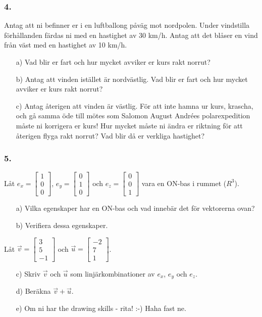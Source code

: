 \documentclass{article}
\begin{document}
\subsubsection*{4.}
Antag att ni befinner er i en luftballong påväg mot nordpolen. Under vindstilla förhållanden färdas ni med en hastighet av 30 km/h. Antag att det blåser en vind från väst med en hastighet av 10 km/h.
\begin{itemize}
\item[a) ] Vad blir er fart och hur mycket avviker er kurs rakt norrut?
\item[b) ] Antag att vinden istället är nordvästlig. Vad blir er fart och hur mycket avviker er kurs rakt norrut?
\item[c) ] Antag återigen att vinden är västlig. För att inte hamna ur kurs, krascha, och gå samma öde till mötes som Salomon August Andrées polarexpedition måste ni korrigera er kurs! Hur mycket måste ni ändra er riktning för att återigen flyga rakt norrut? Vad blir då er verkliga hastighet?
\end{itemize}

\subsubsection*{5.}
Låt $e_x = \begin{bmatrix} 1 \\ 0 \\ 0 \end{bmatrix}$, $e_y = \begin{bmatrix} 0 \\ 1 \\ 0 \end{bmatrix}$ och $e_z = \begin{bmatrix} 0 \\ 0 \\ 1 \end{bmatrix}$ vara en ON-bas i rummet ($R^3$).
\begin{itemize}
\item[a) ] Vilka egenskaper har en ON-bas och vad innebär det för vektorerna ovan?
\item[b) ] Verifiera dessa egenskaper.
\end{itemize}

Låt $\vec{v} = \begin{bmatrix} 3 \\ 5 \\ -1 \end{bmatrix}$ och $\vec{u} = \begin{bmatrix} -2 \\ 7 \\ 1 \end{bmatrix}$. 
\begin{itemize} 
\item[c) ] Skriv $\vec{v}$ och $\vec{u}$ som linjärkombinationer av $e_x$, $e_y$ och $e_z$.
\item[d) ] Beräkna $\vec{v} + \vec{u}$.
\item[e) ] Om ni har the drawing skills - rita! :-) Haha fast ne. 
\end{itemize}
\end{document}
